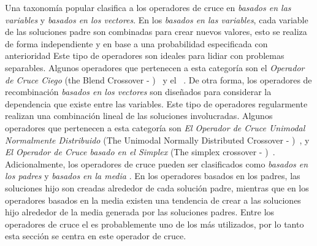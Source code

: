 Una taxonomía popular clasifica a los operadores de cruce en \textit{basados en las variables} y \textit{basados en los vectores}.
%
En los \textit{basados en las variables}, cada variable de las soluciones padre son combinadas para crear nuevos valores, esto se realiza de forma independiente y en base a una probabilidad especificada con anterioridad 
%
Este tipo de operadores son ideales para lidiar con problemas separables.
%
Algunos operadores que pertenecen a esta categoría son el \textit{Operador de Cruce Ciego} (the Blend Crossover - \BLX{})~\cite{eshelman1993real} y el \SBX~\cite{Joel:SBX1994}.
%
De otra forma, los operadores de recombinación \textit{basados en los vectores} son diseñados para considerar la dependencia que existe entre las variables.
%
Este tipo de operadores regularmente realizan una combinación lineal de las soluciones involucradas.
%
Algunos operadores que pertenecen a esta categoría son \textit{El Operador de Cruce Unimodal Normalmente Distribuido} (The Unimodal Normally Distributed Crossover - \UNDX{})~\cite{Joel:UNDX}, y \textit{El Operador de Cruce basado en el Simplex} (The simplex crossover - \SPX{})~\cite{Joel:DE_Storn_SPX}.
%
Adicionalmente, los operadores de cruce pueden ser clasificados como \textit{basados en los padres} y \textit{basados en la media} \cite{jain2011parent}.
%
En los operadores basados en los padres, las soluciones hijo son creadas alrededor de cada solución padre, mientras que en los operadores basados en la media existen una tendencia de crear a las soluciones hijo alrededor de la media generada por las soluciones padres.
%
Entre los operadores de cruce el \SBX{} es probablemente uno de los más utilizados, por lo tanto esta sección se centra en este operador de cruce.

